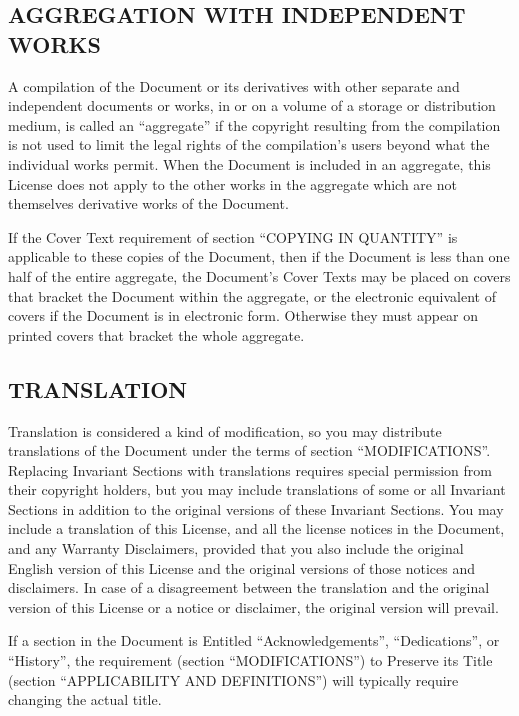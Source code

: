 \documentclass[a4paper,german,10pt,twoside]{book}
\begin{document}
{\begin{appendix}
{\subsection*{AGGREGATION WITH INDEPENDENT WORKS}
\label{aggregation}

A compilation of the Document or its derivatives with other separate and independent documents or
works, in or on a volume of a storage or distribution medium, is called an ``aggregate'' if the
copyright resulting from the compilation is not used to limit the legal rights of the compilation's
users beyond what the individual works permit. When the Document is included in an aggregate, this
License does not apply to the other works in the aggregate which are not themselves derivative
works of the Document.

If the Cover Text requirement of section ``COPYING IN QUANTITY'' is applicable to these copies of
the Document, then if the Document is less than one half of the entire aggregate, the Document's
Cover Texts may be placed on covers that bracket the Document within the aggregate, or the
electronic equivalent of covers if the Document is in electronic form. Otherwise they must appear
on printed covers that bracket the whole aggregate.


\subsection*{TRANSLATION}
\label{translation}

Translation is considered a kind of modification, so you may distribute translations of the
Document under the terms of section ``MODIFICATIONS''. Replacing Invariant Sections with
translations requires special permission from their copyright holders, but you may include
translations of some or all Invariant Sections in addition to the original versions of these
Invariant Sections.	 You may include a translation of this License, and all the license notices in
the Document, and any Warranty Disclaimers, provided that you also include the original English
version of this License and the original versions of those notices and disclaimers.	 In case of a
disagreement between the translation and the original version of this License or a notice or
disclaimer, the original version will prevail.

If a section in the Document is Entitled ``Acknowledgements'', ``Dedications'', or ``History'', the
requirement (section ``MODIFICATIONS'') to Preserve its Title (section ``APPLICABILITY AND
DEFINITIONS'') will typically require changing the actual title.


}
\end{appendix}}
\end{document}
